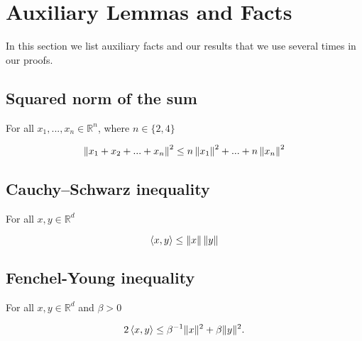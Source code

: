 
\section{Auxiliary Lemmas and Facts}

    In this section we list auxiliary facts and our results that we use several times in our proofs.

    \subsection{Squared norm of the sum}
    \label{axil:squared}
        For all $x_1, ... , x_n \in \mathbb{R}^n$, where $n \in \{2, 4\}$

        \begin{equation*}
            \left\| x_1 + x_2 + ... + x_n \right\|^2 \leq n \left\| x_1 \right\|^2 + ... + n \left\| x_n \right\|^2
        \end{equation*}

    \subsection{Cauchy–Schwarz inequality}
    \label{axil:cauchy_schwarz}
        For all $x, y \in \mathbb{R}^d$

        \begin{equation*}
            \left\langle x,y \right\rangle \leq \left\| x \right\|\left\| y \right\|
        \end{equation*}

    \subsection{Fenchel-Young inequality}
    \label{axil:fenchel_young}
    For all $x, y \in \mathbb{R}^d$ and $\beta > 0$
    
    \begin{equation*}
        2 \left\langle x,y \right\rangle \leq \beta^{-1} \|x\|^2 + \beta \|y\|^2 .
    \end{equation*}

